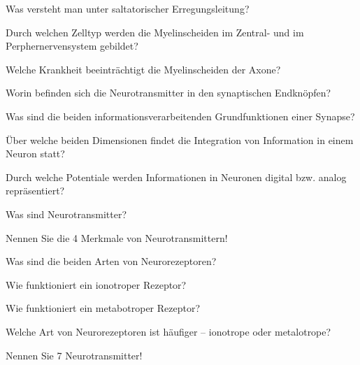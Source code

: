 \documentclass[10pt, a4paper]{exam}
\begin{document}
\begin{questions}
  \question Was versteht man unter saltatorischer Erregungsleitung?
  \begin{solution}
  \end{solution}
  \question Durch welchen Zelltyp werden die Myelinscheiden im Zentral- und im Perphernervensystem gebildet?
  \begin{solution}
  \end{solution}
  \question Welche Krankheit beeinträchtigt die Myelinscheiden der Axone?
  \begin{solution}
  \end{solution}
  \question Worin befinden sich die Neurotransmitter in den synaptischen Endknöpfen?
  \begin{solution}
  \end{solution}
  \question Was sind die beiden informationsverarbeitenden Grundfunktionen einer Synapse?
  \begin{solution}
  \end{solution}
  \question Über welche beiden Dimensionen findet die Integration von Information in einem Neuron statt?
  \begin{solution}
  \end{solution}
  \question Durch welche Potentiale werden Informationen in Neuronen digital bzw. analog repräsentiert?
  \begin{solution}
  \end{solution}
  \question Was sind Neurotransmitter?
  \begin{solution}
  \end{solution}
  \question Nennen Sie die 4 Merkmale von Neurotransmittern!
  \begin{solution}
  \end{solution}
  \question Was sind die beiden Arten von Neurorezeptoren?
  \begin{solution}
  \end{solution}
  \question Wie funktioniert ein ionotroper Rezeptor?
  \begin{solution}
  \end{solution}
  \question Wie funktioniert ein metabotroper Rezeptor?
  \begin{solution}
  \end{solution}
  \question Welche Art von Neurorezeptoren ist häufiger – ionotrope oder metalotrope?
  \begin{solution}
  \end{solution}
  \question Nennen Sie 7 Neurotransmitter!
  \begin{solution}

\end{solution}
\end{questions}
\end{document}
